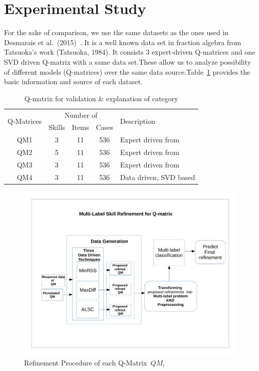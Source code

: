 \documentclass[runningheads,a4paper]{llncs}
\begin{document}
\section{Experimental Study}\label{sec:experimental-study}

For the sake of comparison, we use the same datasets as the ones used in Desmarais et al.\ (2015)~\cite{tatsuoka1983rule,desmarais2015combining}. It is a well known data set in
fraction algebra from Tatsuoka's work (Tatsuoka, 1984)\cite{tatsuoka1983rule}. It consists 3 expert-driven Q-matrices and one SVD driven Q-matrix with a same data set.These allow us to analyze possibility of different models (Q-matrices) over the same data source.Table~\ref{tab:qm} provides the basic information and source of each dataset.   

\begin{table} 
\begin{center}
  \caption{Q-matrix for validation \& explanation of category}\label{tab:qm}
  \begin{tabular}{|ccccp{4cm}<{\raggedright}|}
  \hline
  \toprule
\multirow{2}{*}{Q-Matrices} & \multicolumn{3}{c}{Number of} & \multirow{2}{*|}{Description} \\
  \cline{2-4}
  & Skills &  Items & \multicolumn{1}{c}{Cases} & \\
  \midrule
QM1 & 3 & 11 & 536 & {Expert driven from \cite{henson2009defining} } \\
	\hline
QM2 & 5 & 11 & 536 & {Expert driven from \cite{de2008empirically} } \\  
 	\hline
QM3 & 3 & 11 & 536 & {Expert driven from \cite{CDM}} \\  
  	\hline 
QM4 & 3 & 11 & 536 & {Data driven, SVD based} \\  
  	\hline
  	\end{tabular}  
\end{center}	
\end{table}

\begin{figure}\label{fig:RP}
  \centering
    \includegraphics[width=100 mm ,scale=0.25]{graph/RP.pdf}
  \caption{Refinement Procedure of each Q-Matrix~$QM_i$ }
\end{figure}
\end{document}
